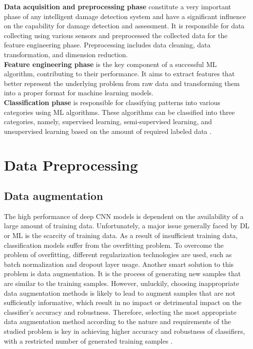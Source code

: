 {\bf Data acquisition and preprocessing phase} constitute a very important phase 
of any intelligent damage detection system and have a significant influence on 
the capability for damage detection and assessment. It is responsible for data 
collecting using various sensors and preprocessed the collected data for the 
feature engineering phase. Preprocessing includes data cleaning, data 
transformation, and dimension reduction. \\

{\bf Feature engineering phase} is the key component of a successful ML algorithm, 
contributing to their performance. It aims to extract features that better 
represent the underlying problem from raw data and transforming them into 
a proper format for machine learning models. \\

{\bf Classification phase} is responsible for classifying patterns into various 
categories using ML algorithms. These algorithms can be classified into three 
categories, namely, supervised learning, semi-supervised learning, and 
unsupervised learning based on the amount of required labeled data \cite{esr20}.


\section{Data Preprocessing}

\subsection{Data augmentation}
The high performance of deep CNN models is dependent on the availability 
of a large amount of training data. Unfortunately, a major issue generally 
faced by DL or ML is the scarcity of training data. As a result of insufficient 
training data, classification models suffer from the overfitting problem. To 
overcome the problem of overfitting, different regularization technologies are used, 
such as batch normalization and dropout layer usage. Another smart solution to this 
problem is data augmentation. It is the process of generating new samples that are 
similar to the training samples. However, unluckily, choosing inappropriate data 
augmentation methods is likely to lead to augment samples that are not sufficiently 
informative, which result in no impact or detrimental impact on the classifier's accuracy and 
robustness. Therefore, selecting the most appropriate data augmentation method according to the 
nature and requirements of the studied problem is key in achieving higher accuracy and robustness 
of classifiers, with a restricted number of generated training samples \cite{esr20}.

